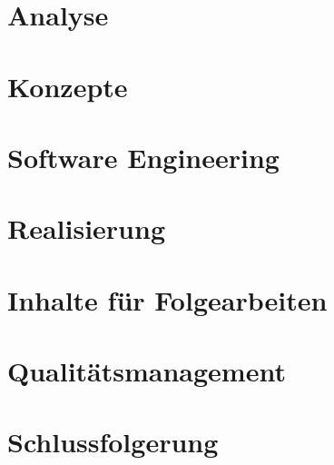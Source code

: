 \documentclass[12pt, a4paper]{report}
\begin{document}
	\chapter{Analyse}
	
		
	\chapter{Konzepte}
		
	
	
	\chapter{Software Engineering}
		
	
	
	
	\chapter{Realisierung}
	

	
	\chapter{Inhalte für Folgearbeiten}
	
	
	
	\chapter{Qualitätsmanagement}
		
	
	\chapter{Schlussfolgerung}
	
	
	
\end{document}
